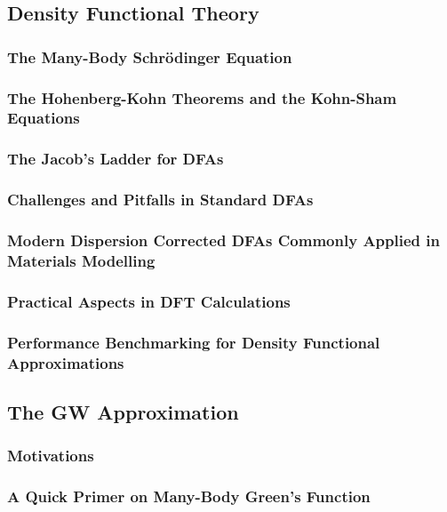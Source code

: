 \documentclass[%
aip,
rmp,
10pt, 
amsmath,
amssymb,
floatfix,
nofootinbib,
]{revtex4-2}
\begin{document}
\subsection{Density Functional Theory}
\label{sec:DFT}
\subsubsection{The Many-Body Schr\"{o}dinger Equation}

\subsubsection{The Hohenberg-Kohn Theorems and the Kohn-Sham Equations }
  
\subsubsection{The Jacob's Ladder for DFAs}

\subsubsection{Challenges and Pitfalls in Standard DFAs} \label{sect:DFA_challenge}

\subsubsection{Modern Dispersion Corrected DFAs Commonly Applied in Materials Modelling}

\subsubsection{Practical Aspects in DFT Calculations}\label{sect:practical_DFT}

\subsubsection{Performance Benchmarking for Density Functional Approximations}

\label{sec:DFT_benchmark}

\subsection{The GW Approximation}\label{sect:GW_approximation}
\subsubsection{Motivations}\label{sect:motivation_GW}

\subsubsection{A Quick Primer on Many-Body Green's Function}

\end{document}
